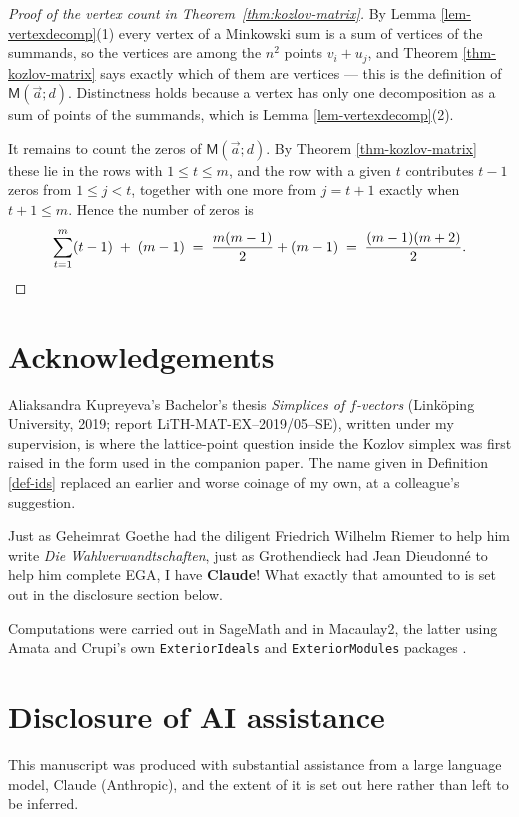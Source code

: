 \documentclass[11pt, a4paper, abstract=yes]{scrartcl}
\theoremstyle{definition}
\theoremstyle{remark}
\theoremstyle{plain}
\newcommand{\extten}{\mathsf{M}}
\let\autocite\cite
\begin{document}
\begin{proof}[Proof of the vertex count in Theorem~\ref{thm:kozlov-matrix}]
By Lemma \ref{lem-vertexdecomp}(1) every vertex of a Minkowski sum is a sum of vertices of the summands,
so the vertices are among the \(n^2\) points \(v_i+u_j\), and
Theorem \ref{thm-kozlov-matrix} says exactly which of them are vertices --- this is the definition of
\(\extten(\vec a;d)\). Distinctness holds because a vertex has only one decomposition as a sum of
points of the summands, which is Lemma \ref{lem-vertexdecomp}(2).

It remains to count the zeros of \(\extten(\vec a;d)\). By Theorem \ref{thm-kozlov-matrix} these lie in
the rows with \(1\le t\le m\), and the row with a given \(t\) contributes \(t-1\) zeros from
\(1\le j<t\), together with one more from \(j=t+1\) exactly when \(t+1\le m\). Hence the number of
zeros is
\begin{equation}\label{eq:gapK-6}
  \sum_{t=1}^{m}(t-1)\;+\;(m-1)\;=\;\frac{m(m-1)}{2}+(m-1)\;=\;\frac{(m-1)(m+2)}{2}. \qedhere
\end{equation}
\end{proof}
\section*{Acknowledgements}
\label{sec:org8485c5e}
Aliaksandra Kupreyeva's Bachelor's thesis \emph{Simplices of \(f\)-vectors} (Linköping University, 2019;
report LiTH-MAT-EX--2019/05--SE), written under my supervision, is where the lattice-point question
inside the Kozlov simplex was first raised in the form used in the companion paper. The name given in
Definition \ref{def-ids} replaced an earlier and worse coinage of my own, at a colleague's suggestion.

Just as Geheimrat Goethe had the diligent Friedrich Wilhelm Riemer to help him write \emph{Die
Wahlverwandtschaften}, just as Grothendieck had Jean Dieudonné to help him complete EGA, I have
\textbf{Claude}! What exactly that amounted to is set out in the disclosure section below.

Computations were carried out in SageMath and in Macaulay2, the latter using
Amata and Crupi's own \texttt{ExteriorIdeals} and \texttt{ExteriorModules} packages
\autocite{AmataCrupi2018ExteriorIdeals,AmataCrupi2021,Macaulay2,SageMath}.
\section*{Disclosure of AI assistance}
\label{sec:org0eb4a7f}
This manuscript was produced with substantial assistance from a large language model, Claude
(Anthropic), and the extent of it is set out here rather than left to be inferred.
\end{document}
